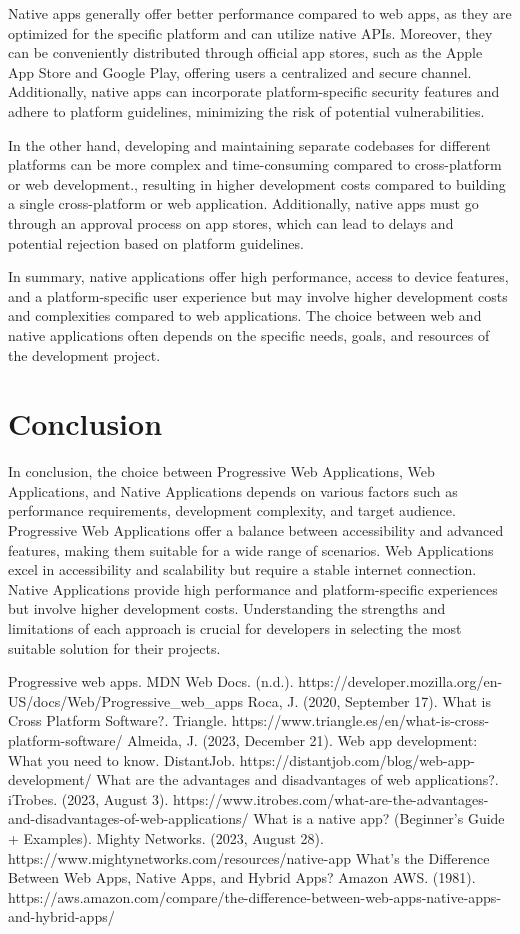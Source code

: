 \documentclass[conference]{IEEEtran}
\begin{document}
Native apps generally offer better performance compared to web apps, as they are optimized for the specific platform and can utilize native APIs. Moreover, they can be conveniently distributed through official app stores, such as the Apple App Store and Google Play, offering users a centralized and secure channel. Additionally, native apps can incorporate platform-specific security features and adhere to platform guidelines, minimizing the risk of potential vulnerabilities.

In the other hand, developing and maintaining separate codebases for different platforms can be more complex and time-consuming compared to cross-platform or web development., resulting in higher development costs compared to building a single cross-platform or web application. Additionally, native apps must go through an approval process on app stores, which can lead to delays and potential rejection based on platform guidelines.

In summary, native applications offer high performance, access to device features, and a platform-specific user experience but may involve higher development costs and complexities compared to web applications. The choice between web and native applications often depends on the specific needs, goals, and resources of the development project.

 \section{Conclusion}
In conclusion, the choice between Progressive Web Applications, Web Applications, and Native Applications depends on various factors such as performance requirements, development complexity, and target audience. Progressive Web Applications offer a balance between accessibility and advanced features, making them suitable for a wide range of scenarios. Web Applications excel in accessibility and scalability but require a stable internet connection. Native Applications provide high performance and platform-specific experiences but involve higher development costs. Understanding the strengths and limitations of each approach is crucial for developers in selecting the most suitable solution for their projects.
\begin{thebibliography}{00}
 Progressive web apps. MDN Web Docs. (n.d.). https://developer.mozilla.org/en-US/docs/Web/Progressive\_web\_apps
 Roca, J. (2020, September 17). What is Cross Platform Software?. Triangle. https://www.triangle.es/en/what-is-cross-platform-software/
 Almeida, J. (2023, December 21). Web app development: What you need to know. DistantJob. https://distantjob.com/blog/web-app-development/
 What are the advantages and disadvantages of web applications?. iTrobes. (2023, August 3). https://www.itrobes.com/what-are-the-advantages-and-disadvantages-of-web-applications/ 
 What is a native app? (Beginner’s Guide + Examples). Mighty Networks. (2023, August 28). https://www.mightynetworks.com/resources/native-app
 What’s the Difference Between Web Apps, Native Apps, and Hybrid Apps? Amazon AWS. (1981). https://aws.amazon.com/compare/the-difference-between-web-apps-native-apps-and-hybrid-apps/
\end{thebibliography}
\end{document}
